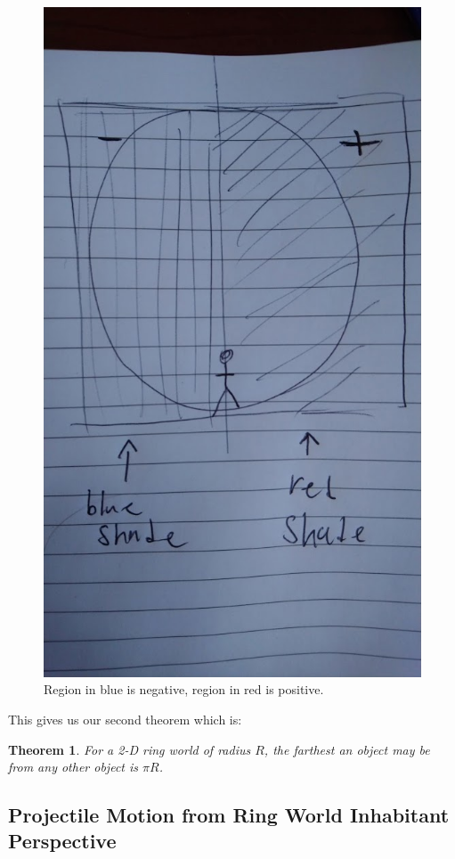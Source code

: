 \documentclass{amsart}
\newtheorem{theorem}{Theorem}[section]
\theoremstyle{definition}
\begin{document}
\begin{figure}
	\centering
	\includegraphics[width=0.7\linewidth]{figures/define_neg_pos_rough.JPG}
	\caption{Region in blue is negative, region in red is positive.}
	\label{fig:neg_positive_horizontal}
\end{figure}

This gives us our second theorem which is: 
\begin{theorem}
  For a 2-D ring world of radius $R$, the farthest an object may be from any other object is $\pi R$.
\end{theorem}

\subsection{Projectile Motion from Ring World Inhabitant Perspective}
\end{document}
